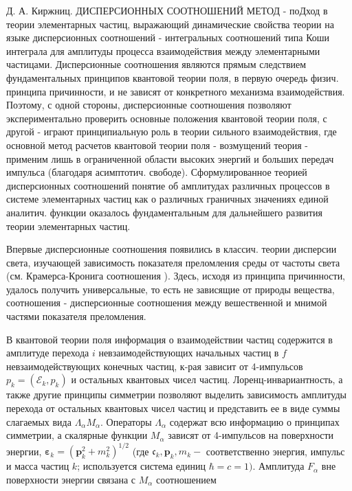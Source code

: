 \documentclass[10pt]{article}
\begin{document}
Д. А. Киржниц. ДИСПЕРСИОННЫХ СООТНОШЕНИЙ МЕТОД - поДход в теории элементарных частиц, выражающий динамические свойства теории на языке дисперсионных соотношений - интегральных соотношений типа Коши интеграла для амплитуды процесса взаимодействия между элементарными частицами. Дисперсионные соотношения являются прямым следствием фундаментальных принципов квантовой теории поля, в первую очередь физич. принципа причинности, и не зависят от конкретного механизма взаимодействия. Поэтому, с одной стороны, дисперсионные соотношения позволяют экспериментально проверить основные положения квантовой теории поля, с другой - играют принципиальную роль в теории сильного взаимодействия, где основной метод расчетов квантовой теории поля - возмущений теория - применим лишь в ограниченной области высоких энергий и больших передач импульса (благодаря асимптотич. свободе). Сформулированное теорией дисперсионных соотношений понятие об амплитудах различных процессов в системе элементарных частиц как о различных граничных значениях единой аналитич. функции оказалось фундаментальным для дальнейшего развития теории элементарных частиц.



Впервые дисперсионные соотношения появились в классич. теории дисперсии света, изучающей зависимость показателя преломления среды от частоты света (см. Крамерса-Кронига соотношения ). Здесь, исходя из принципа причинности, удалось получить универсальные, то есть не зависящие от природы вещества, соотношения - дисперсионные соотношения между вешественной и мнимой частями показателя преломления.



В квантовой теории поля информация о взаимодействии частиц содержится в амплитуде перехода $i$ невзаимодействующих начальных частиц в $f$ невзаимодействующих конечных частиц, к-рая зависит от 4-импульсов $p_{k}=\left(\mathscr{E}_{k}, p_{k}\right)$ и остальных квантовых чисел частиц. Лоренц-инвариантность, а также другие принципы симметрии позволяют выделить зависимость амплитуды перехода от остальных квантовых чисел частиц и представить ее в виде суммы слагаемых вида $\Lambda_{\alpha} M_{\alpha}$. Операторы $\Lambda_{\alpha}$ содержат всю информацию о принципах симметрии, а скалярные функции $M_{\alpha}$ зависят от 4-импульсов на поверхности энергии, $\boldsymbol{\varepsilon}_{k}=\left(\boldsymbol{p}_{k}^{2}+m_{k}^{2}\right)^{1 / 2}$ (где $\mathfrak{c}_{k}, \boldsymbol{p}_{k}, m_{k}-$ соответственно энергия, импульс и масса частиц $k$; используется система единиц $\hbar=c=1)$. Амплитуда $F_{\alpha}$ вне поверхности энергии связана с $M_{\alpha}$ соотношением
\end{document}
